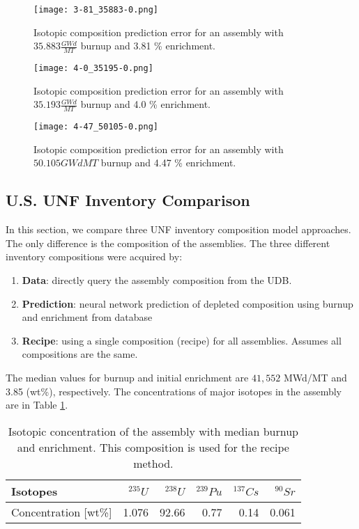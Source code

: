 \begin{figure}
    \centering
    \texttt{[image: 3-81\_35883-0.png]}
    \caption{Isotopic composition prediction error for an assembly with 
             $35.883 \frac{GWd}{MT}$ burnup and 3.81  \% enrichment.}
    \label{fig:3-81_35883-0}
\end{figure}

\begin{figure}
    \centering
    \texttt{[image: 4-0\_35195-0.png]}
    \caption{Isotopic composition prediction error for an assembly with 
             $35.193 \frac{GWd}{MT}$ burnup and 4.0 \% enrichment.}
    \label{fig:4-0_35195-0}
\end{figure}


\begin{figure}
    \centering
    \texttt{[image: 4-47\_50105-0.png]}
    \caption{Isotopic composition prediction error for an assembly with 
             $50.105 {GWd}{MT}$ burnup and 4.47  \% enrichment.}
    \label{fig:4-47_50105-0}
\end{figure}

\FloatBarrier

\subsection{U.S. \gls{UNF} Inventory Comparison}

In this section, we compare three \gls{UNF} inventory composition
model approaches.
The only difference is the composition of the
assemblies. The three different inventory compositions were acquired by:

\begin{enumerate}
    \item \textbf{Data}: directly query the assembly composition from the \gls{UDB}.
    \item \textbf{Prediction}: neural network prediction of depleted composition using burnup and enrichment from database
    \item \textbf{Recipe}: using a single composition (recipe) for all assemblies. Assumes all compositions are the same.
\end{enumerate}

The median values for burnup and initial enrichment are
$41,552$ MWd/MT and 3.85 (wt\%), respectively. The concentrations of major
isotopes in the assembly are in Table \ref{tab:avg_assem}.


\begin{table}[h]
    \centering
    \begin{tabular}{|l|r|r|r|r|r|}
        \hline
        Isotopes & $^{235}U$ & $^{238}U$ & $^{239}Pu$ & $^{137}Cs$ & $^{90}Sr$ \\
        \hline
        Concentration [wt\%] & 1.076 & 92.66 & 0.77 & 0.14 & 0.061 \\
        \hline
    \end{tabular}
    \caption{Isotopic concentration of the assembly with median burnup and
             enrichment. This composition is used for the recipe method.}
    \label{tab:avg_assem}
\end{table}


